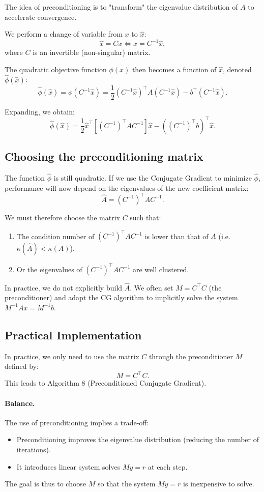 The idea of preconditioning is to "transform" the eigenvalue distribution of $A$ to accelerate convergence.

We perform a change of variable from $x$ to $\hat{x}$:
\[
\hat{x} = C x \iff x = C^{-1} \hat{x},
\]
where $C$ is an invertible (non-singular) matrix.

The quadratic objective function $\phi(x)$ then becomes a function of $\hat{x}$, denoted $\hat{\phi}(\hat{x})$:
\[
\hat{\phi}(\hat{x}) = \phi(C^{-1}\hat{x}) = \frac{1}{2} (C^{-1}\hat{x})^\top A (C^{-1}\hat{x}) - b^\top (C^{-1}\hat{x}).
\]

Expanding, we obtain:
\[
\hat{\phi}(\hat{x}) = \frac{1}{2} \hat{x}^\top \left[ (C^{-1})^\top A C^{-1} \right] \hat{x} - \left( (C^{-1})^\top b \right)^\top \hat{x}.
\]

\subsection{Choosing the preconditioning matrix}

The function $\hat{\phi}$ is still quadratic. If we use the Conjugate Gradient to minimize $\hat{\phi}$, performance will now depend on the eigenvalues of the new coefficient matrix:
\[
\hat{A} = (C^{-1})^\top A C^{-1}.
\]

We must therefore choose the matrix $C$ such that:
\begin{enumerate}
    \item The condition number of $(C^{-1})^\top A C^{-1}$ is lower than that of $A$ (i.e. $\kappa(\hat{A}) < \kappa(A)$).
    \item Or the eigenvalues of $(C^{-1})^\top A C^{-1}$ are well clustered.
\end{enumerate}

In practice, we do not explicitly build $\hat{A}$. We often set $M = C^\top C$ (the preconditioner) and adapt the CG algorithm to implicitly solve the system $M^{-1} A x = M^{-1} b$.

\subsection{Practical Implementation}

In practice, we only need to use the matrix $C$ through the preconditioner $M$ defined by:
\[
M = C^\top C.
\]
This leads to Algorithm 8 (Preconditioned Conjugate Gradient).

\paragraph{Balance.}
The use of preconditioning implies a trade-off:
\begin{itemize}
    \item[(+)] Preconditioning improves the eigenvalue distribution (reducing the number of iterations).
    \item[(-)] It introduces linear system solves $M y = r$ at each step.
\end{itemize}
The goal is thus to choose $M$ so that the system $M y = r$ is inexpensive to solve.

